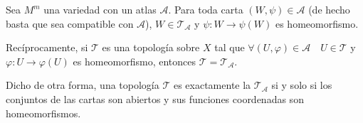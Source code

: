 \documentclass[../VD.tex]{subfiles}
\begin{document}
\begin{lemma}[label={lem:caract-topnat-2}]
  Sea \(M^{m}\) una variedad con un atlas \(\mathcal{A}\).
  Para toda carta \((W,\psi) \in \mathcal{A}\) (de hecho basta que sea
  compatible con \(\mathcal{A}\)), \(W \in
  \mathcal{T}_{\mathcal{A}}\) y \(\psi \colon W \to \psi(W)\) es homeomorfismo.

  Recíprocamente, si \(\mathcal{T}\) es una topología sobre \(X\) tal que
  \(\forall (U,\varphi) \in \mathcal{A} \quad U \in \mathcal{T}\) y \(\varphi
  \colon U \to \varphi(U)\) es homeomorfismo, entonces \(\mathcal{T} =
  \mathcal{T}_{\mathcal{A}}\).

  Dicho de otra forma, una topología \(\mathcal{T}\) es exactamente la
   \(\mathcal{T}_{\mathcal{A}}\) si y solo si los conjuntos
  de las cartas son abiertos y sus funciones coordenadas son homeomorfismos.
\end{lemma}
\end{document}
